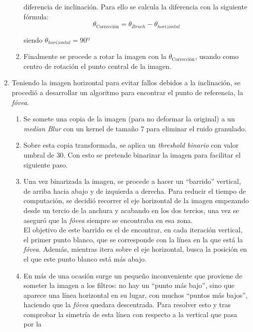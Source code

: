 \begin{enumerate}
\begin{enumerate}[label*=\arabic*.]
    diferencia de inclinación. Para ello se calcula la diferencia con
    la siguiente fórmula:
    \begin{equation*}
      \theta_\text{Corrección} = \theta_{Bruch} - \theta_{horizontal} 
    \end{equation*}
    \begin{center}
      siendo $\theta_{horizontal} = 90º$
    \end{center}
  \item Finalmente se procede a rotar la imagen con la
    $\theta_{\text{Corrección}}$, usando como centro de rotación el
    punto central de la imagen.
  \end{enumerate}
\item Teniendo la imagen horizontal para evitar fallos debidos a la
  inclinación, se procedió a desarrollar un algoritmo para encontrar
  el punto de referencia, la \emph{fóvea}.
  \begin{enumerate}[label*=\arabic*.]
  \item Se somete una copia de la imagen (para no deformar la
    original) a un \emph{median Blur} con un kernel de tamaño 7 para
    eliminar el ruido granulado.
  \item Sobre esta copia transformada, se aplica un \emph{threshold
      binario} con valor umbral de 30. Con esto se pretende binarizar
    la imagen para facilitar el siguiente paso.
  \item Una vez binarizada la imagen, se procede a hacer un ``barrido''
    vertical, de arriba hacia abajo y de izquierda a derecha. Para
    reducir el tiempo de computación, se decidió recorrer el eje
    horizontal de la imagen empezando desde un tercio de la anchura y
    acabando en los dos tercios, una vez se aseguró que la
    \emph{fóvea} siempre se encontraba en esa zona. \\
    El objetivo de este barrido es el de encontrar, en cada iteración
    vertical, el primer punto blanco, que se corresponde con la línea
    en la que está la \emph{fóvea}. Además, mientras itera sobre el
    eje horizontal, busca la posición en el que este punto blanco está
    más abajo.
  \item En más de una ocasión surge un pequeño inconveniente que
    proviene de someter la imagen a los filtros: no hay un ``punto más
    bajo'', sino que aparece una línea horizontal en su lugar, con
    muchos ``puntos más bajos'', haciendo que la \emph{fóvea} quedara
    descentrada. Para resolver esto y tras comprobar la simetría de
    esta línea con respecto a la vertical que pasa por la

\end{enumerate}
\end{enumerate}
